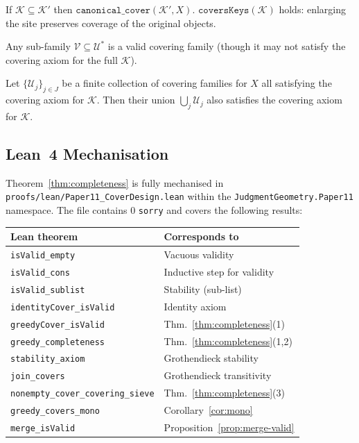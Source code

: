 \documentclass[11pt]{article}
\begin{document}
\begin{corollary}[Monotonicity]
\label{cor:mono}
If $\mathcal{K} \subseteq \mathcal{K}'$ then
$\texttt{canonical\_cover}(\mathcal{K}', X).$ $\texttt{coversKeys}(\mathcal{K})$
holds: enlarging the site preserves coverage of the original objects.
\end{corollary}

\begin{corollary}
\label{cor:stability}
Any sub-family $\mathcal{V} \subseteq \mathcal{U}^*$ is a valid
covering family (though it may not satisfy the covering axiom for the
full $\mathcal{K}$).
\end{corollary}

\begin{corollary}[Transitivity]
\label{cor:trans}
Let $\{\mathcal{U}_j\}_{j \in J}$ be a finite collection of covering
families for $X$ all satisfying the covering axiom for $\mathcal{K}$.
Then their union $\bigcup_j \mathcal{U}_j$ also satisfies the covering
axiom for $\mathcal{K}$.
\end{corollary}

\subsection{Lean~4 Mechanisation}

Theorem~\ref{thm:completeness} is fully mechanised in
\texttt{proofs/lean/Paper11\_CoverDesign.lean} within the
\texttt{JudgmentGeometry.Paper11} namespace.
The file contains 0 \texttt{sorry} and covers the following results:

\begin{center}
\begin{tabular}{ll}
\toprule
\textbf{Lean theorem} & \textbf{Corresponds to} \\
\midrule
\texttt{isValid\_empty}                   & Vacuous validity \\
\texttt{isValid\_cons}                    & Inductive step for validity \\
\texttt{isValid\_sublist}                 & Stability (sub-list) \\
\texttt{identityCover\_isValid}           & Identity axiom \\
\texttt{greedyCover\_isValid}             & Thm.~\ref{thm:completeness}(1) \\
\texttt{greedy\_completeness}             & Thm.~\ref{thm:completeness}(1,2) \\
\texttt{stability\_axiom}                 & Grothendieck stability \\
\texttt{join\_covers}                     & Grothendieck transitivity \\
\texttt{nonempty\_cover\_covering\_sieve} & Thm.~\ref{thm:completeness}(3) \\
\texttt{greedy\_covers\_mono}             & Corollary~\ref{cor:mono} \\
\texttt{merge\_isValid}                   & Proposition~\ref{prop:merge-valid} \\
\bottomrule
\end{tabular}
\end{center}
\end{document}
